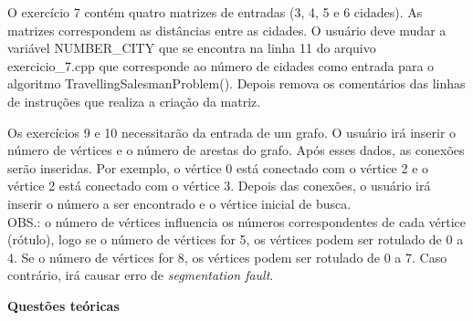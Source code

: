 \documentclass[12pt,a4paper]{article}
\begin{document}
O exercício 7 contém quatro matrizes de entradas (3, 4, 5 e 6 cidades). As matrizes correspondem as distâncias entre as cidades. O usuário deve mudar a variável \textsf{NUMBER\_CITY} que se encontra na linha 11 do arquivo \textsf{exercicio\_7.cpp} que corresponde ao número de cidades como entrada para o algoritmo \textsf{TravellingSalesmanProblem()}. Depois remova os comentários das linhas de instruções que realiza a criação da matriz.

Os exercícios 9 e 10 necessitarão da entrada de um grafo. O usuário irá inserir o número de vértices e o número de arestas do grafo. Após esses dados, as conexões serão inseridas. Por exemplo, o vértice 0 está conectado com o vértice 2 e o vértice 2 está conectado com o vértice 3. Depois das conexões, o usuário irá inserir o número a ser encontrado e o vértice inicial de busca. \\
OBS.: o número de vértices influencia os números correspondentes de cada vértice (rótulo), logo se o número de vértices for 5, os vértices podem ser rotulado de 0 a 4. Se o número de vértices for 8, os vértices podem ser rotulado de 0 a 7. Caso contrário, irá causar erro de \textit{segmentation fault}.





\vspace{1cm}

{\Large \textbf{Questões teóricas}}
\end{document}
